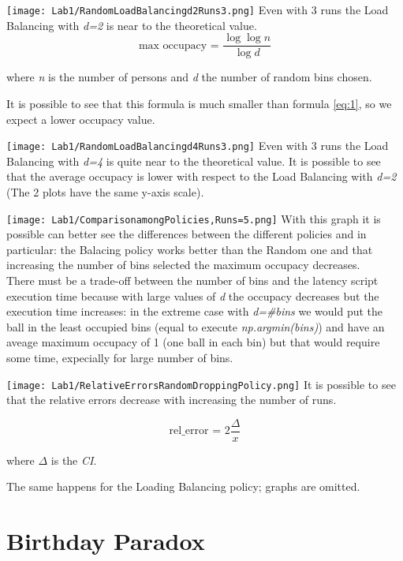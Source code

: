 \documentclass{report}
\begin{document}
			\texttt{[image: Lab1/RandomLoadBalancingd2Runs3.png]}
			Even with 3 runs the Load Balancing with \emph{d=2} is near to the theoretical value.
			\begin{equation} \label{eq:2}
				 \text{max occupacy = }\frac{\log \log n}{\log d}
			\end{equation}
			\begin{center}
					where \emph{n} is the number of persons and \emph{d} the number of random bins chosen.
			\end{center}
			It is possible to see that this formula is much smaller than formula \ref{eq:1}, so we expect a lower occupacy value.
			
			\texttt{[image: Lab1/RandomLoadBalancingd4Runs3.png]}
			Even with 3 runs the Load Balancing with \emph{d=4} is quite near to the theoretical value. 
			It is possible to see that the average occupacy is lower with respect to the Load Balancing with \emph{d=2} (The 2 plots have the same y-axis scale).
			
			\texttt{[image: Lab1/ComparisonamongPolicies,Runs=5.png]}
			With this graph it is possible can better see the differences between the different policies and in particular: the Balacing policy works better than the Random one and that increasing the number of bins selected the maximum occupacy decreases. \\ There must be a trade-off between the number of bins and the latency script execution time because with large values of \emph{d} the occupacy decreases but the execution time increases: in the extreme case with \emph{d=\#bins} we would put the ball in the least occupied bins (equal to execute \emph{np.argmin(bins)}) and have an aveage maximum occupacy of 1 (one ball in each bin)  but that would require some time, expecially for large number of bins.
			
			\texttt{[image: Lab1/RelativeErrorsRandomDroppingPolicy.png]}
			It is possible to see that the relative errors decrease with increasing the number of runs. 
			
			\begin{equation} \label{eq:3}
				 \text{rel\_error = }2\frac{\Delta}{x}
			\end{equation}
			\begin{center}
					where $\Delta$ is the \emph{CI}.
			\end{center}
			The same happens for the Loading Balancing policy; graphs are omitted.
			
\chapter{Birthday Paradox}
	 
\end{document}
